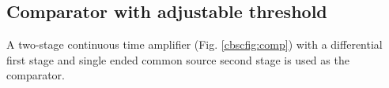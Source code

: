  


\subsection{Comparator with adjustable threshold}
A two-stage continuous time amplifier
(Fig. \ref{cbscfig:comp}) with a differential first stage and single
ended common source second stage is used as the comparator. 

